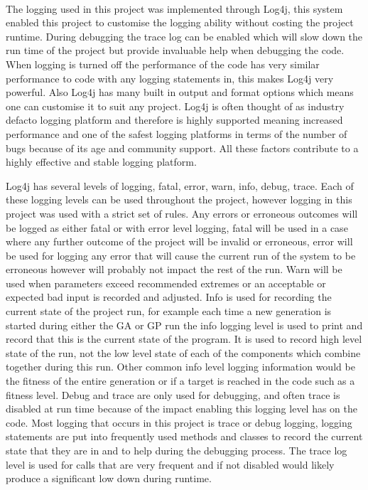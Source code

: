 \documentclass[12pt]{article}
\begin{document}
\paragraph{}

The logging used in this project was implemented through Log4j, this system enabled this project to customise the logging 
ability without costing the project runtime. During debugging the trace log can be enabled which will slow down the
run time of the project but provide invaluable help when debugging the code. When logging is turned off the performance
of the code has very similar performance to code with any logging statements in, this makes Log4j very powerful. Also
Log4j has many built in output and format options which means one can customise it to suit any project. Log4j is often
thought of as industry defacto logging platform and therefore is highly supported meaning increased performance
and one of the safest logging platforms in terms of the number of bugs because of its age and community support. All these
factors contribute to a highly effective and stable logging platform. 

Log4j has several levels of logging, fatal, error, warn, info, debug, trace. Each of these logging levels can be used throughout
the project, however logging in this project was used with a strict set of rules. Any errors or erroneous outcomes will 
be logged as either fatal or with error level logging, fatal will be used in a case where any further outcome of the project
will be invalid or erroneous, error will be used for logging any error that will cause the current run of the system to be
erroneous however will probably not impact the rest of the run. Warn will be used when parameters exceed recommended
extremes or an acceptable or expected bad input is recorded and adjusted. Info is used for recording the current state of
the project run, for example each time a new generation is started during either the GA or GP run the info logging level is
used to print and record that this is the current state of the program. It is used to record high level state of the run,
not the low level state of each of the components which combine together during this run. Other common info level logging
information would be the fitness of the entire generation or if a target is reached in the code such as a fitness level.
Debug and trace are only used for debugging, and often trace is disabled at run time because of the impact enabling this
logging level has on the code. Most logging that occurs in this project is trace or debug logging, logging statements are
put into frequently used methods and classes to record the current state that they are in and to help during the debugging
process. The trace log level is used for calls that are very frequent and if not disabled would likely produce a significant
low down during runtime. 
\end{document}
